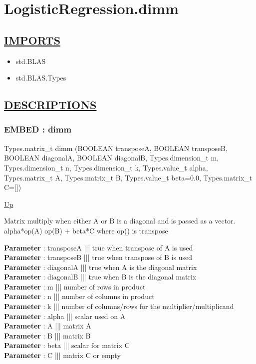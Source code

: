 \chapter*{LogisticRegression.dimm}
\hypertarget{ecldoc:toc:LogisticRegression.dimm}{}

\section*{\underline{IMPORTS}}
\begin{itemize}
\item std.BLAS
\item std.BLAS.Types
\end{itemize}

\section*{\underline{DESCRIPTIONS}}
\subsection*{EMBED : dimm}
\hypertarget{ecldoc:logisticregression.dimm}{}
\begin{minipage}[t]{\textwidth}
\begin{flushleft}
Types.matrix\_t dimm (BOOLEAN transposeA, BOOLEAN transposeB, BOOLEAN diagonalA, BOOLEAN diagonalB, Types.dimension\_t m, Types.dimension\_t n, Types.dimension\_t k, Types.value\_t alpha, Types.matrix\_t A, Types.matrix\_t B, Types.value\_t beta=0.0, Types.matrix\_t C=[])
\end{flushleft}
\end{minipage}
\hyperlink{ecldoc:toc:LogisticRegression}{Up}

\par
Matrix multiply when either A or B is a diagonal and is passed as a vector. alpha*op(A) op(B) + beta*C where op() is transpose
\par
\textbf{Parameter} : transposeA ||| true when transpose of A is used \\
\textbf{Parameter} : transposeB ||| true when transpose of B is used \\
\textbf{Parameter} : diagonalA ||| true when A is the diagonal matrix \\
\textbf{Parameter} : diagonalB ||| true when B is the diagonal matrix \\
\textbf{Parameter} : m ||| number of rows in product \\
\textbf{Parameter} : n ||| number of columns in product \\
\textbf{Parameter} : k ||| number of columns/rows for the multiplier/multiplicand \\
\textbf{Parameter} : alpha ||| scalar used on A \\
\textbf{Parameter} : A ||| matrix A \\
\textbf{Parameter} : B ||| matrix B \\
\textbf{Parameter} : beta ||| scalar for matrix C \\
\textbf{Parameter} : C ||| matrix C or empty \\
